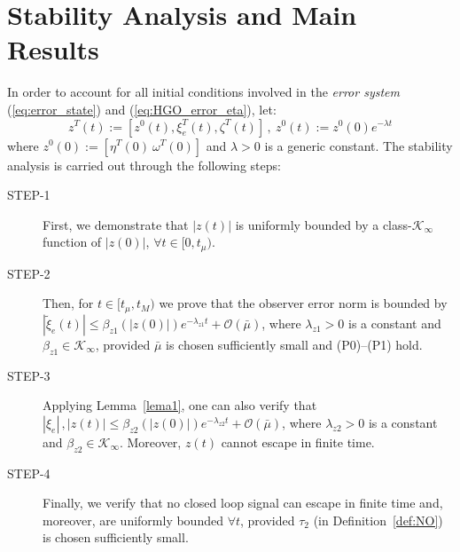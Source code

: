 \documentclass{rncauth}
\begin{document}
\section{Stability Analysis and Main Results} \label{sec:ISS}
In order to account for all initial conditions involved in
the {\em error system} (\ref{eq:error_state}) and
(\ref{eq:HGO_error_eta}), let: 
%
\begin{equation}
z^T(t)\!:=\![z^0(t),\xi_e^T(t),\zeta^T(t)]\,, \
z^0(t)\!:=\!z^0(0)e^{-\lambda t} \label{eq:defz}
\end{equation}
%
where $z^0(0)\!:=\![\eta^T(0) \ \omega^T(0)]$ and $\lambda>0$ is a
generic constant. The stability analysis is carried out through
the following steps:
\begin{description}
\item[STEP-1] First, we demonstrate that $|z(t)|$ is uniformly
bounded by a class-$\mathcal{K}_\infty$ function of $|z(0)|$,
$\forall t\!\in\![0,t_\mu)$.

\item[STEP-2] Then, for $t \in [t_\mu,t_M)$ we prove that the
observer error norm is bounded by $|\tilde{\xi}_e(t)| \leq
\beta_{z1}(|z(0)|)e^{-\lambda_{z1} t} + \mathcal{O}(\bar{\mu})$,
where $\lambda_{z1}>0$ is a constant and $\beta_{z1} \in
\mathcal{K}_\infty$, provided $\bar{\mu}$ is chosen sufficiently
small and (P0)--(P1) hold.

\item[STEP-3] Applying Lemma~\ref{lema1}, one can also verify that
$|\xi_e|\,,|z(t)| \leq \beta_{z2}(|z(0)|)e^{-\lambda_{z2}
t}+\mathcal{O}(\bar{\mu})$, where $\lambda_{z2}>0$ is a constant
and $\beta_{z2} \in \mathcal{K}_\infty$. Moreover, $z(t)$ cannot
escape in finite time.

\item[STEP-4] Finally, we verify that no closed loop signal
can escape in finite time and, moreover, are uniformly bounded
$\forall t$, provided $\tau_2$ (in Definition~\ref{def:NO}) is
chosen sufficiently small.

\end{description}
\end{document}
